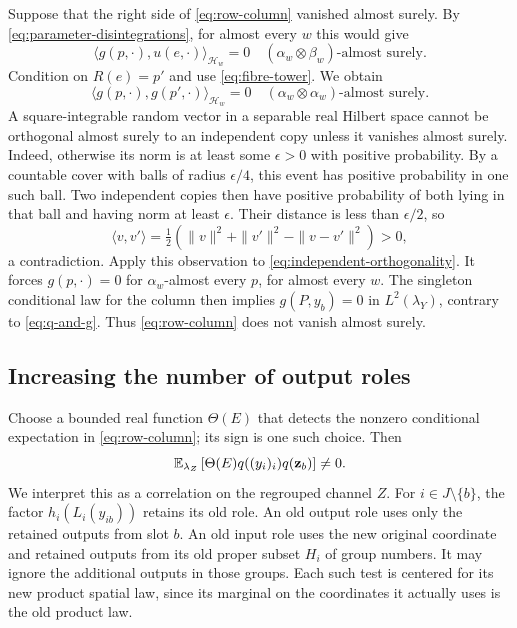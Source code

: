 Suppose that the right side of \eqref{eq:row-column} vanished
almost surely. By \eqref{eq:parameter-disintegrations}, for almost
every $w$ this would give
\[
  \langle g(p,\cdot),u(e,\cdot)\rangle_{\mathcal H_w}=0
  \quad(\alpha_w\otimes\beta_w)\text{-almost surely}.
\]
Condition on $R(e)=p'$ and use \eqref{eq:fibre-tower}. We obtain
\begin{equation}
 \langle g(p,\cdot),g(p',\cdot)\rangle_{\mathcal H_w}=0
 \quad(\alpha_w\otimes\alpha_w)\text{-almost surely}.
 \label{eq:independent-orthogonality}
\end{equation}
A square-integrable random vector in a separable real Hilbert
space cannot be orthogonal almost surely to an independent copy
unless it vanishes almost surely. Indeed, otherwise its norm is at
least some $\epsilon>0$ with positive probability. By a countable
cover with balls of radius $\epsilon/4$, this event has positive
probability in one such ball. Two independent copies then have
positive probability of both lying in that ball and having norm
at least $\epsilon$. Their distance is less than $\epsilon/2$, so
\[
 \langle v,v'\rangle
 =\tfrac12(\|v\|^2+\|v'\|^2-\|v-v'\|^2)>0,
\]
a contradiction. Apply this observation to
\eqref{eq:independent-orthogonality}. It forces $g(p,\cdot)=0$
for $\alpha_w$-almost every $p$, for almost every $w$.
The singleton conditional law for the column then implies
$g(P,y_b)=0$ in $L^2(\lambda_Y)$, contrary to
\eqref{eq:q-and-g}. Thus \eqref{eq:row-column} does not vanish
almost surely.

\subsection{Increasing the number of output roles}

Choose a bounded real function $\Theta(E)$ that detects the
nonzero conditional expectation in \eqref{eq:row-column}; its sign
is one such choice. Then
\begin{equation}
 \mathbb E_{\lambda_Z}\left[
   \Theta(E)q((y_i)_i)q(\mathbf z_b)\right]\ne0.
 \label{eq:improved-correlation}
\end{equation}
We interpret this as a correlation on the regrouped channel $Z$.
For $i\in J\setminus\{b\}$, the factor
$h_i(L_i(y_{ib}))$ retains its old role. An old output role uses
only the retained outputs from slot $b$. An old input role uses
the new original coordinate and retained outputs from its old
proper subset $H_i$ of group numbers. It may ignore the additional
outputs in those groups. Each such test is centered for its new
product spatial law, since its marginal on the coordinates it
actually uses is the old product law.

